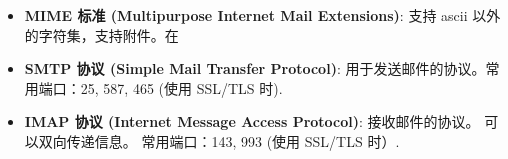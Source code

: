 

\begin{issues}
\issueDraft
\end{issues}

\begin{itemize}
\item \textbf{MIME 标准 (Multipurpose Internet Mail Extensions)}: 支持 ascii 以外的字符集，支持附件。在
\item \textbf{SMTP 协议 (Simple Mail Transfer Protocol)}: 用于发送邮件的协议。常用端口：25, 587, 465 (使用 SSL/TLS 时).
\item \textbf{IMAP 协议 (Internet Message Access Protocol)}: 接收邮件的协议。 可以双向传递信息。 常用端口：143, 993 (使用 SSL/TLS 时）.
\end{itemize}
